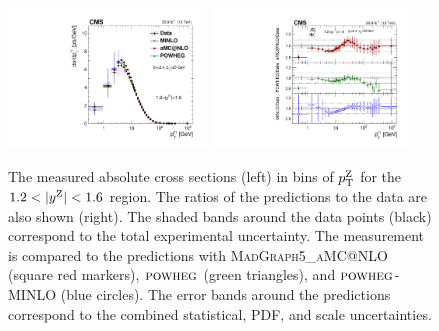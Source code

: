 \begin{figure}
	\centering
	\includegraphics[width=0.47\textwidth]{figures/zpt/zll_double_rap3.pdf}
        \includegraphics[width=0.47\textwidth]{figures/zpt/zll_double_ratio_rap3.pdf}
	\caption{The measured absolute cross sections (left) in bins of $p_{\mathrm{T}}^{\mathrm{Z}}$ for the $1.2 < |y^{\mathrm{Z}}| < 1.6$ region. The ratios of the predictions to the data are also shown (right). The shaded bands around the data points (black) correspond to the total experimental uncertainty. The measurement is compared to the predictions with \textsc{MadGraph5\_aMC@NLO} (square red markers),  ${\textsc{powheg}}$ (green triangles), and ${\textsc{powheg}}$-\textsc{MINLO} (blue circles). The error bands around the predictions correspond to the combined statistical, PDF, and scale uncertainties.}
	\label{fig:zll_double3}
\end{figure}

